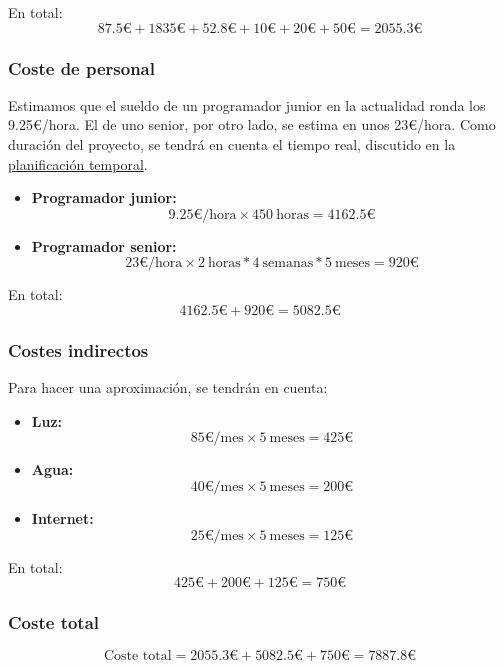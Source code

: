 En total: \[ 87.5\text{€} + 1835\text{€} + 52.8\text{€} + 10\text{€} + 20\text{€} + 50\text{€} = 2055.3\text{€} \]

\subsubsection{Coste de personal}

Estimamos que el sueldo de un programador junior en la actualidad ronda los 9.25€/hora. El de uno senior, por otro lado, se estima en unos 23€/hora. Como duración del proyecto, se tendrá en cuenta el tiempo real, discutido en la \hyperref[ch:planificacion]{planificación temporal}.

\begin{itemize}
    \item\textbf{Programador junior:} \[ 9.25\text{€/hora} \times 450\ \text{horas} = 4162.5\text{€} \]
\end{itemize}

\begin{itemize}
    \item\textbf{Programador senior:} \[ 23\text{€/hora} \times 2\ \text{horas} * 4\ \text{semanas} * 5\ \text{meses} = 920\text{€} \]
\end{itemize}

En total: \[ 4162.5\text{€} + 920\text{€} = 5082.5\text{€} \]

\subsubsection{Costes indirectos}

Para hacer una aproximación, se tendrán en cuenta:

\begin{itemize}
    \item\textbf{Luz:} \[ 85\text{€/mes} \times 5\ \text{meses} = 425\text{€} \]
\end{itemize}

\begin{itemize}
    \item\textbf{Agua:}\[ 40\text{€/mes} \times 5\ \text{meses} = 200\text{€} \]
\end{itemize}

\begin{itemize}
    \item\textbf{Internet:}\[ 25\text{€/mes} \times 5\ \text{meses} = 125\text{€} \]
\end{itemize}

En total: \[ 425\text{€} + 200\text{€} + 125\text{€} = 750\text{€} \]

\subsubsection{Coste total}


\[
    \text{Coste total} = 2055.3\text{€} + 5082.5\text{€} + 750\text{€} = 7887.8\text{€}
\]
